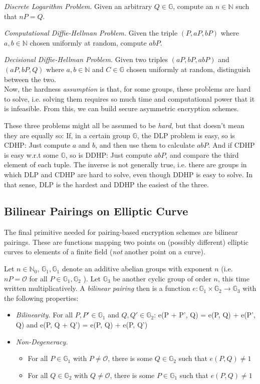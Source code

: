 \emph{Discrete Logarithm Problem.} Given an arbitrary $Q \in \mathbb{G}$, compute an $n \in \mathbb{N}$ such that $n P = Q$. %

\emph{Computational Diffie-Hellman Problem.} Given the triple $(P, aP, bP)$ where $a, b \in \mathbb{N}$ chosen uniformly at random, compute $abP$.

\emph{Decisional Diffie-Hellman Problem.} Given two triples $(aP, bP, abP)$ and $(aP, bP, Q)$ where $a, b \in \mathbb{N}$ and $C \in \mathbb{G}$ chosen uniformly at random, distinguish between the two.
\\

Now, the hardness \emph{assumption} is that, for some groups, these problems are hard to solve, i.e. solving them requires so much time and computational power that it is infeasible.
From this, we can build secure asymmetric encryption schemes.

These three problems might all be assumed to be \emph{hard}, but that doesn't mean they are equally so:
If, in a certain group $\mathbb{G}$, the DLP problem is easy, so is CDHP: Just compute $a$ and $b$, and then use them to calculate $abP$.
And if CDHP is easy w.r.t some $\mathbb{G}$, so is DDHP: Just compute $abP$, and compare the third element of each tuple.
The inverse is not generally true, i.e. there are groups in which DLP and CDHP are hard to solve, even though DDHP is easy to solve.
In that sense, DLP is the hardest and DDHP the easiest of the three. \cite{katz_introduction_2015}

\subsection{Bilinear Pairings on Elliptic Curve}
The final primitive needed for pairing-based encryption schemes are bilinear pairings. These are functions mapping two points on (possibly different) elliptic curves to elements of a finite field (\emph{not} another point on a curve).\cite{blake_advances_2005}

Let $n \in \mathbb{N}_0$, $\mathbb{G}_1, \mathbb{G}_1$ denote an additive abelian groups with exponent $n$ (i.e. $nP = \mathcal{O}$ for all $P \in \mathbb{G}_1, \mathbb{G}_2$ ). 
Let $\mathbb{G}_3$ be another cyclic group of order $n$, this time written multiplicatively.
A \emph{bilinear pairing} then is a function $e: \mathbb{G}_1 \times \mathbb{G}_2 \rightarrow \mathbb{G}_3$ with the following properties:
\begin{itemize}
    \item \emph{Bilinearity.} For all $P, P' \in \mathbb{G}_1$ and $Q, Q' \in \mathbb{G}_2$: e(P + P', Q) = e(P, Q) + e(P', Q) and e(P, Q + Q') = e(P, Q) + e(P, Q')
    \item \emph{Non-Degeneracy.}
    \begin{itemize}
        \item For all $P \in \mathbb{G}_1$ with $P \neq \mathcal{O}$, there is some $Q \in \mathbb{G}_2$ such that $e(P,Q) \neq 1$
        \item For all $Q \in \mathbb{G}_2$ with $Q \neq \mathcal{O}$, there is some $P \in \mathbb{G}_1$ such that $e(P,Q) \neq 1$
    \end{itemize}
\end{itemize}

